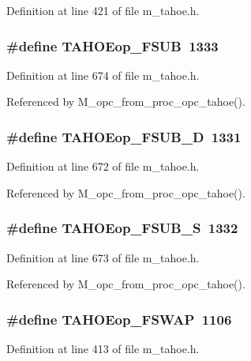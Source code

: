 Definition at line 421 of file m\_\-tahoe.h.
\subsubsection{\setlength{\rightskip}{0pt plus 5cm}\#define TAHOEop\_\-FSUB~1333}\label{m__tahoe_8h_c6c5e8ceed1c0c3abe02d6bf458404eb}




Definition at line 674 of file m\_\-tahoe.h.

Referenced by M\_\-opc\_\-from\_\-proc\_\-opc\_\-tahoe().
\subsubsection{\setlength{\rightskip}{0pt plus 5cm}\#define TAHOEop\_\-FSUB\_\-D~1331}\label{m__tahoe_8h_03b524b65f5266dbdf9f863e292da358}




Definition at line 672 of file m\_\-tahoe.h.

Referenced by M\_\-opc\_\-from\_\-proc\_\-opc\_\-tahoe().
\subsubsection{\setlength{\rightskip}{0pt plus 5cm}\#define TAHOEop\_\-FSUB\_\-S~1332}\label{m__tahoe_8h_42f523868058f94269e34f337f240c93}




Definition at line 673 of file m\_\-tahoe.h.

Referenced by M\_\-opc\_\-from\_\-proc\_\-opc\_\-tahoe().
\subsubsection{\setlength{\rightskip}{0pt plus 5cm}\#define TAHOEop\_\-FSWAP~1106}\label{m__tahoe_8h_b533db3a0e4fc85dd282fc30906ad1f8}




Definition at line 413 of file m\_\-tahoe.h.
